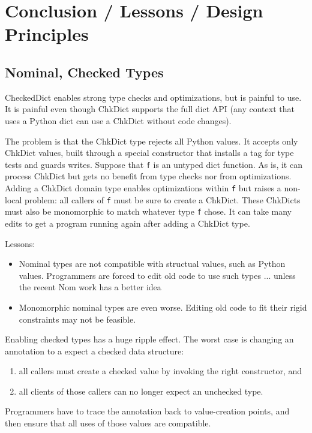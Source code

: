 \documentclass[english,cleveref,submission]{programming}
\newcommand{\code}[1]{\texttt{#1}}
\begin{document}
\section{Conclusion / Lessons / Design Principles}
\label{s:conclusion}

\subsection{Nominal, Checked Types}
\label{s:concrete-migration}

CheckedDict enables strong type checks and optimizations, but is painful to use.
It is painful even though ChkDict supports the full dict API
(any context that uses a Python dict can use a ChkDict without code changes).

The problem is that the ChkDict type rejects all Python values.
It accepts only ChkDict values, built through a special constructor
that installs a tag for type tests and guards writes.
Suppose that \code{f} is an untyped dict function.
As is, it can process ChkDict but gets no benefit from type checks nor from optimizations.
Adding a ChkDict domain type enables optimizations within \code{f} but raises a non-local
problem: all callers of \code{f} must be sure to create a ChkDict.
These ChkDicts must also be monomorphic to match whatever type \code{f} chose.
It can take many edits to get a program running again after adding a ChkDict type.

Lessons:
\begin{itemize}
  \item
    Nominal types are not compatible with structual values, such as Python values.
    Programmers are forced to edit old code to use such types ... unless the recent Nom work has a better idea~\cite{mt-oopsla-2021}
  \item
    Monomorphic nominal types are even worse.
    Editing old code to fit their rigid constraints may not be feasible.

\end{itemize}

Enabling checked types has a huge ripple effect.
The worst case is changing an annotation to a expect a checked data structure:
\begin{enumerate}
  \item all callers must create a checked value by invoking the right constructor, and
  \item all clients of those callers can no longer expect an unchecked type.
\end{enumerate}
Programmers have to trace the annotation back to value-creation points, and then
ensure that all uses of those values are compatible.
\end{document}
